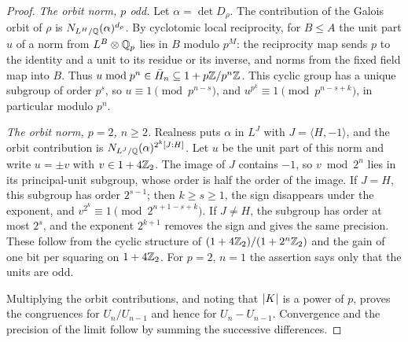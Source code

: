 \begin{proof}
\emph{The orbit norm, $p$ odd.} Let $\alpha=\det D_\rho$. The contribution
of the Galois orbit of $\rho$ is $N_{L^H/\mathbb{Q}}(\alpha)^{d_\rho}$. By
cyclotomic local reciprocity, for $B\le A$ the unit part $u$ of a norm
from $L^B\otimes\mathbb{Q}_p$ lies in $B$ modulo $p^M$: the reciprocity map sends
$p$ to the identity and a unit to its residue or its inverse, and norms
from the fixed field map into $B$. Thus
$u\bmod p^n\in\bar H_n\subseteq1+p\mathbb{Z}/p^n\mathbb{Z}$. This cyclic group has a
unique subgroup of order $p^s$, so $u\equiv1\pmod{p^{n-s}}$, and
$u^{p^k}\equiv1\pmod{p^{n-s+k}}$, in particular modulo $p^n$.

\emph{The orbit norm, $p=2$, $n\ge2$.} Realness puts $\alpha$ in $L^J$
with $J=\langle H,-1\rangle$, and the orbit contribution is
$N_{L^J/\mathbb{Q}}(\alpha)^{2^k[J:H]}$. Let $u$ be the unit part of this norm and
write $u=\pm v$ with $v\in1+4\mathbb{Z}_2$. The image of $J$ contains $-1$, so
$v\bmod2^n$ lies in its principal-unit subgroup, whose order is half the
order of the image. If $J=H$, this subgroup has order $2^{s-1}$; then
$k\ge s\ge1$, the sign disappears under the exponent, and
$v^{2^k}\equiv1\pmod{2^{n+1-s+k}}$. If $J\ne H$, the subgroup has order at
most $2^s$, and the exponent $2^{k+1}$ removes the sign and gives the same
precision. These follow from the cyclic structure of
$(1+4\mathbb{Z}_2)/(1+2^n\mathbb{Z}_2)$ and the gain of one bit per squaring on $1+4\mathbb{Z}_2$.
For $p=2$, $n=1$ the assertion says only that the units are odd.

Multiplying the orbit contributions, and noting that $\lvert K\rvert$ is a power
of $p$, proves the congruences for $U_n/U_{n-1}$ and hence for
$U_n-U_{n-1}$. Convergence and the precision of the limit follow by
summing the successive differences.
\end{proof}


